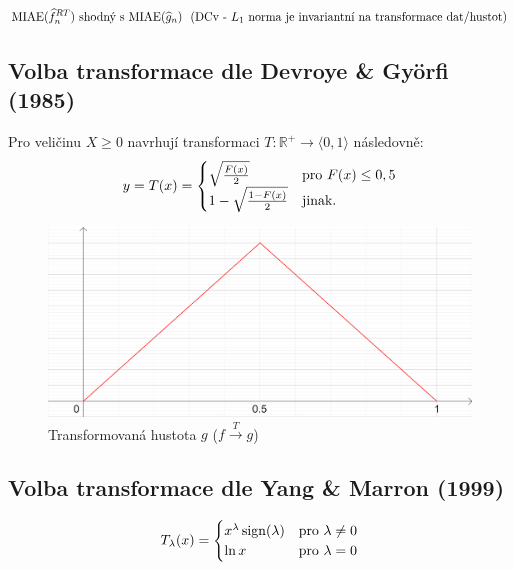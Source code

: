 \documentclass{article}
\theoremstyle{remark}
\theoremstyle{plain}
\theoremstyle{definition}
\theoremstyle{remark}
\DeclareMathOperator{\sign}{sign}
\begin{document}
\begin{align*}
    \textnormal{MIAE}(\widehat{f}_n^{RT})\textnormal{ shodný s MIAE}(\widehat{g}_n)\,\,\,\,\textnormal{(DCv - }L_1\textnormal{ norma je invariantní na transformace dat/hustot)}
\end{align*}

\subsection{Volba transformace dle Devroye \& Györfi (1985)}

Pro veličinu $X\geq 0$ navrhují transformaci $T:\mathbb{R}^+\to\langle 0,1\rangle$ následovně:
\begin{align*}
    y=T(x)=\begin{cases}
    \sqrt{\frac{F(x)}{2}} & \textnormal{pro }F(x)\leq 0,5 \\
    1-\sqrt{\frac{1-F(x)}{2}} & \textnormal{jinak.} \\
    \end{cases}
\end{align*}

\begin{figure}[h]
    \centering
    \includegraphics[scale=9]{pics/rovnoramenna_hustota.png}
    \caption{Transformovaná hustota $g$ ($f\xrightarrow{T}g$)}
\end{figure}

\subsection{Volba transformace dle Yang \& Marron (1999)}

\begin{align*}
    T_\lambda(x)=\begin{cases}
    x^\lambda\sign(\lambda) & \textnormal{pro }\lambda\neq 0 \\
    \ln x & \textnormal{pro }\lambda=0 \\
    \end{cases}
\end{align*}
\end{document}
